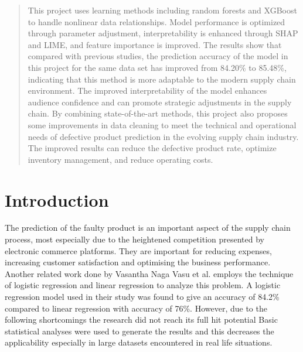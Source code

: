 \documentclass[conference]{IEEEtran}
\begin{document}
\maketitle

\begin{abstract}
This project uses learning methods including random forests and XGBoost to handle nonlinear data relationships. Model performance is optimized through parameter adjustment, interpretability is enhanced through SHAP and LIME, and feature importance is improved. The results show that compared with previous studies, the prediction accuracy of the model in this project for the same data set has improved from 84.20\% to 85.48\%, indicating that this method is more adaptable to the modern supply chain environment. The improved interpretability of the model enhances audience confidence and can promote strategic adjustments in the supply chain. By combining state-of-the-art methods, this project also proposes some improvements in data cleaning to meet the technical and operational needs of defective product prediction in the evolving supply chain industry. The improved results can reduce the defective product rate, optimize inventory management, and reduce operating costs.
\end{abstract}


\section{Introduction}

The prediction of the faulty product is an important aspect of the supply chain process, most especially due to the heightened competition presented by electronic commerce platforms. They are important for reducing expenses, increasing customer satisfaction and optimising the business performance. Another related work done by Vasantha Naga Vasu et al. employs the technique of logistic regression and linear regression to analyze this problem. A logistic regression model used in their study was found to give an accuracy of 84.2\% compared to linear regression with accuracy of 76\%. However, due to the following shortcomings the research did not reach its full hit potential Basic statistical analyses were used to generate the results and this decreases the applicability especially in large datasets encountered in real life situations.
\end{document}
